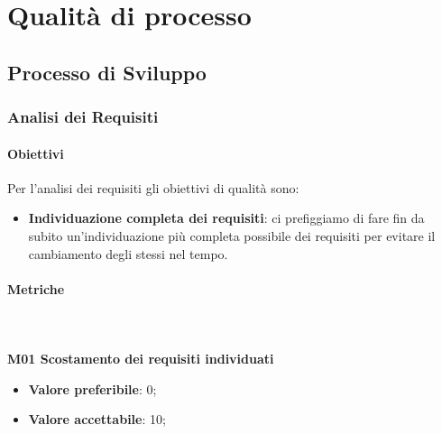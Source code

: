 \section{Qualità di processo}
	\subsection{Processo di Sviluppo}
		\subsubsection{Analisi dei Requisiti} 
			\paragraph{Obiettivi}
			Per l'analisi dei requisiti gli obiettivi di qualità sono:
			\begin{itemize}
				\item \textbf{Individuazione completa dei requisiti}: ci prefiggiamo di fare fin da subito un'individuazione più completa possibile dei requisiti per evitare il cambiamento degli stessi nel tempo.
			\end{itemize}
			\paragraph{Metriche} \mbox{} \\ \\
				\textbf{M01 Scostamento dei requisiti individuati} 
				\begin{itemize}
					\item \textbf{Valore preferibile}: 0;
					\item \textbf{Valore accettabile}: 10;
				\end{itemize}
			
